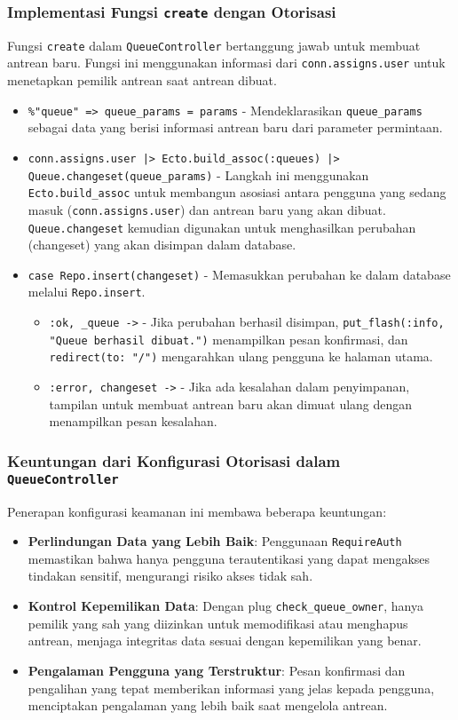 \subsubsection{Implementasi Fungsi \texttt{create} dengan Otorisasi}
Fungsi \texttt{create} dalam \texttt{QueueController} bertanggung jawab untuk membuat antrean baru. Fungsi ini menggunakan informasi dari \texttt{conn.assigns.user} untuk menetapkan pemilik antrean saat antrean dibuat.

\begin{itemize}
	\item \texttt{\%{"queue" => queue\_params} = params} - Mendeklarasikan \texttt{queue\_params} sebagai data yang berisi informasi antrean baru dari parameter permintaan.
	\item \texttt{conn.assigns.user |> Ecto.build\_assoc(:queues) |> Queue.changeset(queue\_params)} - Langkah ini menggunakan \texttt{Ecto.build\_assoc} untuk membangun asosiasi antara pengguna yang sedang masuk (\texttt{conn.assigns.user}) dan antrean baru yang akan dibuat. \texttt{Queue.changeset} kemudian digunakan untuk menghasilkan perubahan (changeset) yang akan disimpan dalam database.
	\item \texttt{case Repo.insert(changeset)} - Memasukkan perubahan ke dalam database melalui \texttt{Repo.insert}. 
	\begin{itemize}
		\item \texttt{{:ok, \_queue} ->} - Jika perubahan berhasil disimpan, \texttt{put\_flash(:info, "Queue berhasil dibuat.")} menampilkan pesan konfirmasi, dan \texttt{redirect(to: "/")} mengarahkan ulang pengguna ke halaman utama.
		\item \texttt{{:error, changeset} ->} - Jika ada kesalahan dalam penyimpanan, tampilan untuk membuat antrean baru akan dimuat ulang dengan menampilkan pesan kesalahan.
	\end{itemize}
\end{itemize}

\subsubsection{Keuntungan dari Konfigurasi Otorisasi dalam \texttt{QueueController}}
Penerapan konfigurasi keamanan ini membawa beberapa keuntungan:

\begin{itemize}
	\item \textbf{Perlindungan Data yang Lebih Baik}: Penggunaan \texttt{RequireAuth} memastikan bahwa hanya pengguna terautentikasi yang dapat mengakses tindakan sensitif, mengurangi risiko akses tidak sah.
	\item \textbf{Kontrol Kepemilikan Data}: Dengan plug \texttt{check\_queue\_owner}, hanya pemilik yang sah yang diizinkan untuk memodifikasi atau menghapus antrean, menjaga integritas data sesuai dengan kepemilikan yang benar.
	\item \textbf{Pengalaman Pengguna yang Terstruktur}: Pesan konfirmasi dan pengalihan yang tepat memberikan informasi yang jelas kepada pengguna, menciptakan pengalaman yang lebih baik saat mengelola antrean.
\end{itemize}

